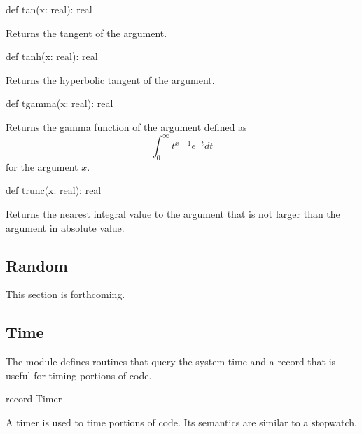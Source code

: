 \begin{protohead}
def tan(x: real): real
\end{protohead}
\begin{protobody}
Returns the tangent of the argument.
\end{protobody}

\begin{protohead}
def tanh(x: real): real
\end{protohead}
\begin{protobody}
Returns the hyperbolic tangent of the argument.
\end{protobody}

\begin{protohead}
def tgamma(x: real): real
\end{protohead}
\begin{protobody}
Returns the gamma function of the argument defined as
$$\int_0^\infty t^{x-1} e^{-t} dt$$
for the argument $x$.
\end{protobody}

\begin{protohead}
def trunc(x: real): real
\end{protohead}
\begin{protobody}
Returns the nearest integral value to the argument that is not larger
than the argument in absolute value.
\end{protobody}

\subsection{Random}
\label{Random}

This section is forthcoming.

\subsection{Time}
\label{Time}

The module  defines routines that query the system time and
a record  that is useful for timing portions of code.

\vspace{1pc}

\begin{protohead}
record Timer
\end{protohead}
\begin{protobody}
A timer is used to time portions of code.  Its semantics are similar
to a stopwatch.
\end{protobody}

